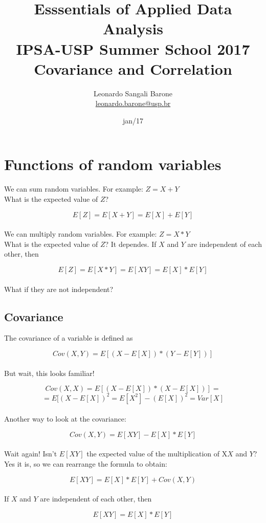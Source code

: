 \documentclass[11pt]{article}
\title{\textbf{Esssentials of Applied Data Analysis\\
				IPSA-USP Summer School 2017}\newline\\
				Covariance and Correlation}
\author{Leonardo Sangali Barone\\ \href{leonardo.barone@usp.br}{leonardo.barone@usp.br}}
\date{jan/17}
\begin{document}
\maketitle

\section*{Functions of random variables}

	We can sum random variables. For example: $Z=X+Y$\\

	What is the expected value of $Z$?

	\[E[Z] = E[X+Y] = E[X] + E[Y]\]\\

	We can multiply random variables. For example: $Z=X*Y$\\
	
	What is the expected value of $Z$? It dependes. If $X$ and $Y$ are independent of each other, then	

	\[E[Z] = E[X*Y] =E[XY] = E[X] * E[Y]\]\\

	What if they are not independent?

	\subsection*{Covariance}
	
	The covariance of a variable is defined as
	
	\[Cov(X,Y) = E[(X-E[X]) * (Y-E[Y])]\]\\
	
	But wait, this looks familiar!
	
	\[Cov(X,X) = E[(X-E[X]) * (X-E[X])] = \]
	\[= E[(X-E[X])^2 = E[X^2] - (E[X])^2 = Var[X]\]\\

	Another way to look at the covariance:
	
	\[Cov(X,Y) = E[XY] - E[X]*E[Y]\]\\

	Wait again! Isn't $E[XY]$ the expected value of the multiplication of X$X$ and $Y$? Yes it is, so we can rearrange the formula to obtain:

	\[E[XY] = E[X]*E[Y] + Cov(X,Y)\]\\

	If $X$ and $Y$ are independent of each other, then 

	\[E[XY] = E[X]*E[Y]\]\\
\end{document}
